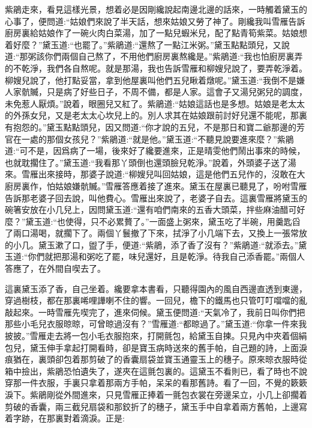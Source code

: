 \begin{parag}
    紫鵑走來，看見這樣光景，想着必是因剛纔說起南邊北邊的話來，一時觸着黛玉的心事了，便問道:“姑娘們來說了半天話，想來姑娘又勞了神了。剛纔我叫雪雁告訴廚房裏給姑娘作了一碗火肉白菜湯，加了一點兒蝦米兒，配了點青筍紫菜。姑娘想着好麼？”黛玉道:“也罷了。”紫鵑道:“還熬了一點江米粥。”黛玉點點頭兒，又說道:“那粥該你們兩個自己熬了，不用他們廚房裏熬纔是。”紫鵑道:“我也怕廚房裏弄的不乾淨，我們各自熬呢。就是那湯，我也告訴雪雁和柳嫂兒說了，要弄乾淨着。柳嫂兒說了，他打點妥當，拿到他屋裏叫他們五兒瞅着燉呢。”黛玉道:“我倒不是嫌人家骯贓，只是病了好些日子，不周不備，都是人家。這會子又湯兒粥兒的調度，未免惹人厭煩。”說着，眼圈兒又紅了。紫鵑道:“姑娘這話也是多想。姑娘是老太太的外孫女兒，又是老太太心坎兒上的。別人求其在姑娘跟前討好兒還不能呢，那裏有抱怨的。”黛玉點點頭兒，因又問道:“你才說的五兒，不是那日和寶二爺那邊的芳官在一處的那個女孩兒？”紫鵑道:“就是他。”黛玉道:“不聽見說要進來麼？”紫鵑道:“可不是，因爲病了一場，後來好了纔要進來，正是晴雯他們鬧出事來的時候，也就耽擱住了。”黛玉道:“我看那丫頭倒也還頭臉兒乾淨。”說着，外頭婆子送了湯來。雪雁出來接時，那婆子說道:“柳嫂兒叫回姑娘，這是他們五兒作的，沒敢在大廚房裏作，怕姑娘嫌骯贓。”雪雁答應着接了進來。黛玉在屋裏已聽見了，吩咐雪雁告訴那老婆子回去說，叫他費心。雪雁出來說了，老婆子自去。這裏雪雁將黛玉的碗箸安放在小几兒上，因問黛玉道:“還有咱們南來的五香大頭菜，拌些麻油醋可好麼？”黛玉道:“也使得，只不必累贅了。”一面盛上粥來，黛玉吃了半碗，用羹匙舀了兩口湯喝，就擱下了。兩個丫鬟撤了下來，拭淨了小几端下去，又換上一張常放的小几。黛玉漱了口，盥了手，便道:“紫鵑，添了香了沒有？”紫鵑道:“就添去。”黛玉道:“你們就把那湯和粥吃了罷，味兒還好，且是乾淨。待我自己添香罷。”兩個人答應了，在外間自喫去了。
\end{parag}


\begin{parag}
    這裏黛玉添了香，自己坐着。纔要拿本書看，只聽得園內的風自西邊直透到東邊，穿過樹枝，都在那裏唏哩譁喇不住的響。一回兒，檐下的鐵馬也只管叮叮噹噹的亂敲起來。一時雪雁先喫完了，進來伺候。黛玉便問道:“天氣冷了，我前日叫你們把那些小毛兒衣服晾晾，可曾晾過沒有？”雪雁道:“都晾過了。”黛玉道:“你拿一件來我披披。”雪雁走去將一包小毛衣服抱來，打開氈包，給黛玉自揀。只見內中夾着個絹包兒，黛玉伸手拿起打開看時，卻是寶玉病時送來的舊手帕，自己題的詩，上面淚痕猶在，裏頭卻包着那剪破了的香囊扇袋並寶玉通靈玉上的穗子。原來晾衣服時從箱中撿出，紫鵑恐怕遺失了，遂夾在這氈包裏的。這黛玉不看則已，看了時也不說穿那一件衣服，手裏只拿着那兩方手帕，呆呆的看那舊詩。看了一回，不覺的簌簌淚下。紫鵑剛從外間進來，只見雪雁正捧着一氈包衣裳在旁邊呆立，小几上卻擱着剪破的香囊，兩三截兒扇袋和那鉸折了的穗子，黛玉手中自拿着兩方舊帕，上邊寫着字跡，在那裏對着滴淚。正是:
\end{parag}



